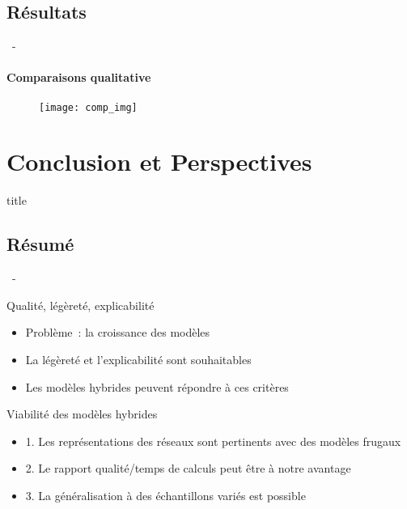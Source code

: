 \documentclass[aspectratio=169, 22pt]{beamer}
\begin{document}
\subsection{Résultats}
\begin{frame}{\secname~- \subsecname}
  \framesubtitle{Comparaisons qualitative}
  \begin{figure}
    \texttt{[image: comp\_img]}
  \end{figure}
\end{frame}

\section{Conclusion et Perspectives}
\begin{frame}
  \begin{beamercolorbox}[sep=15pt,center,shadow=true,rounded=true]{title}
    \LARGE\bfseries \secname
  \end{beamercolorbox}
\end{frame}

\subsection{Résumé}
\begin{frame}{\secname~- \subsecname}
  \begin{customblock}{Qualité, légèreté, explicabilité}
    \begin{itemize}
    \item Problème : la croissance des modèles 
    \item La légèreté et l'explicabilité sont souhaitables
    \item Les modèles hybrides peuvent répondre à ces critères
    \end{itemize}
  \end{customblock}

  \pause
  \begin{exampleblock}{Viabilité des modèles hybrides}
    \begin{itemize}  
    \item 1. Les représentations des réseaux sont pertinents avec des modèles frugaux
    \item 2. Le rapport qualité/temps de calculs peut être à notre avantage
    \item 3. La généralisation à des échantillons variés est possible
    \end{itemize}
  \end{exampleblock}
\end{frame}
\end{document}
